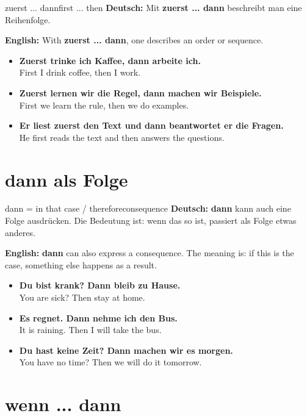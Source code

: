 \documentclass[a4paper,11pt]{article}
\newcommand{\GermanText}[1]{\textbf{Deutsch: }#1\par}
\newcommand{\EnglishText}[1]{{\small\color{SoftGray}\textbf{English: }#1\par}}
\newcommand{\ExampleItem}[2]{\item \textbf{#1}\\{\small\color{SoftGray}#2}}
\begin{document}
\begin{grammarentry}{zuerst ... dann}{first ... then}
\GermanText{Mit \textbf{zuerst ... dann} beschreibt man eine Reihenfolge.}
\EnglishText{With \textbf{zuerst ... dann}, one describes an order or sequence.}

\begin{exbox}
\begin{itemize}
    \ExampleItem{Zuerst trinke ich Kaffee, dann arbeite ich.}{First I drink coffee, then I work.}
    \ExampleItem{Zuerst lernen wir die Regel, dann machen wir Beispiele.}{First we learn the rule, then we do examples.}
    \ExampleItem{Er liest zuerst den Text und dann beantwortet er die Fragen.}{He first reads the text and then answers the questions.}
\end{itemize}
\end{exbox}
\end{grammarentry}

\section{dann als Folge}

\begin{grammarentry}{dann = in that case / therefore}{consequence}
\GermanText{\textbf{dann} kann auch eine Folge ausdrücken. Die Bedeutung ist: wenn das so ist, passiert als Folge etwas anderes.}
\EnglishText{\textbf{dann} can also express a consequence. The meaning is: if this is the case, something else happens as a result.}

\begin{exbox}
\begin{itemize}
    \ExampleItem{Du bist krank? Dann bleib zu Hause.}{You are sick? Then stay at home.}
    \ExampleItem{Es regnet. Dann nehme ich den Bus.}{It is raining. Then I will take the bus.}
    \ExampleItem{Du hast keine Zeit? Dann machen wir es morgen.}{You have no time? Then we will do it tomorrow.}
\end{itemize}
\end{exbox}
\end{grammarentry}

\section{wenn ... dann}
\end{document}
